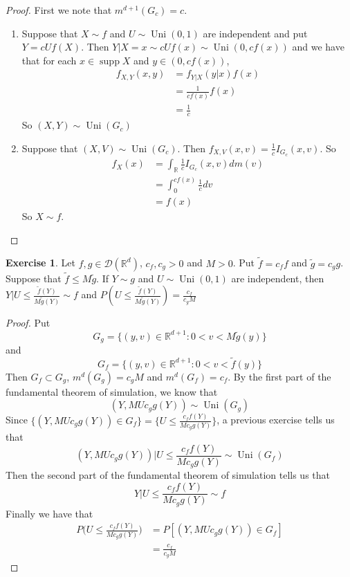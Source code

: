 \documentclass[12pt]{amsart}
\theoremstyle{definition}
\theoremstyle{remark}
\theoremstyle{definition}
\newtheorem{ex}[definition]{Exercise}
\newcommand{\R}{\mathbb{R}}
\newcommand{\MD}{\mathcal{D}}
\DeclareMathOperator{\supp}{supp}
\DeclareMathOperator{\uni}{Uni}
\begin{document}
	\begin{proof} First we note that $m^{d+1}(G_c) = c$. 
		\begin{enumerate}
			\item Suppose that $X \sim f$ and $U \sim \uni(0,1)$ are independent and put $Y = cUf(X)$. Then $Y| X= x \sim cUf(x) \sim \uni(0, cf(x))$ and we have that for each $x \in \supp X$ and $y \in (0, cf(x))$,
			\begin{align*}
				f_{X, Y}(x,y) 
				&= f_{Y|X}(y| x) f(x) \\
				&= \frac{1}{c f(x)}f(x) \\
				&= \frac{1}{c}
			\end{align*}
			So $(X, Y) \sim \uni(G_c)$\\
			\item Suppose that $(X, V) \sim \uni(G_c)$. Then $f_{X,V}(x,v) = \frac{1}{c} I_{G_c}(x,v)$. So 
			\begin{align*}
				f_X(x) 
				&= \int_{\R} \frac{1}{c}I_{G_c}(x,v) dm(v) \\ 
				&= \int_{0}^{cf(x)} \frac{1}{c}dv \\
				&= f(x) 
			\end{align*}
			So $X \sim f$.
		\end{enumerate}
	\end{proof}

	\begin{ex}
		Let $f, g \in \MD(\R^d)$, $c_f,c_g>0$ and $M > 0$. Put $\tilde{f} = c_f f$ and $\tilde{g} = c_g g$. Suppose that $\tilde{f} \leq M \tilde{g}$. If $Y \sim g$ and $U \sim \uni(0,1)$ are independent, then $Y|U \leq \frac{\tilde{f}(Y)}{M\tilde{g}(Y)} \sim f$ and $P ( U \leq \frac{\tilde{f}(Y)}{M\tilde{g}(Y)} ) = \frac{c_f}{c_gM}$ 
	\end{ex}

	\begin{proof}
		Put $$G_g = \{(y,v) \in \R^{d+1}: 0< v < M\tilde{g}(y)\} $$ and $$ G_f = \{(y,v) \in \R^{d+1}: 0< v < \tilde{f}(y)\} $$ 
		Then $G_f \subset G_g$, $m^d(G_g) = c_gM$ and $m^d(G_f) =c_f$. By the first part of the fundamental theorem of simulation, we know that $$(Y, MUc_gg(Y)) \sim \uni(G_g)$$ 
		Since $\{(Y, MUc_gg(Y)) \in G_f \} = \{U \leq \frac{c_ff(Y)}{Mc_gg(Y)}\}$, a previous exercise tells us that $$(Y, MUc_gg(Y))|U \leq \frac{c_ff(Y)}{Mc_gg(Y)} \sim \uni(G_f)$$
		Then the second part of the fundamental theorem of simulation tells us that $$Y|U \leq \frac{c_ff(Y)}{Mc_gg(Y)} \sim f$$
		Finally we have that
		\begin{align*}
			P \bigg( U \leq \frac{c_ff(Y)}{Mc_gg(Y)} \bigg) 
			&= P [(Y, MUc_gg(Y)) \in G_f ]\\
			&= \frac{c_f}{c_gM}
		\end{align*}
	\end{proof}
\end{document}
